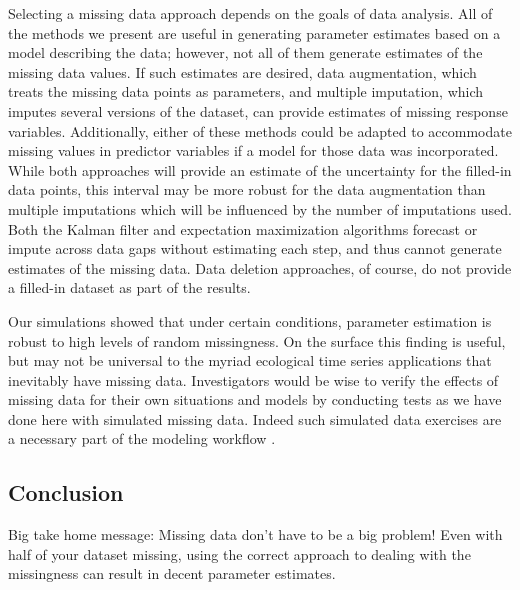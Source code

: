 Selecting a missing data approach depends on the goals of data analysis. All of the methods we present are useful in generating parameter estimates based on a model describing the data; however, not all of them generate estimates of the missing data values. If such estimates are desired, data augmentation, which treats the missing data points as parameters, and multiple imputation, which imputes several versions of the dataset, can provide estimates of missing response variables. Additionally, either of these methods could be adapted to accommodate missing values in predictor variables if a model for those data was incorporated. While both approaches will provide an estimate of the uncertainty for the filled-in data points, this interval may be more robust for the data augmentation than multiple imputations which will be influenced by the number of imputations used. Both the Kalman filter and expectation maximization algorithms forecast or impute across data gaps without estimating each step, and thus cannot generate estimates of the missing data. Data deletion approaches, of course, do not provide a filled-in dataset as part of the results. 




Our simulations showed that under certain conditions, parameter estimation is robust to high levels of random missingness.  On the surface this finding is useful, but may not be universal to the myriad ecological time series applications that inevitably have missing data. Investigators would be wise to verify the effects of missing data for their own situations and models by conducting tests as we have done here with simulated missing data. Indeed such simulated data exercises are a necessary part of the modeling workflow \citep{gelman2020bayesian}.  

\subsection{Conclusion}
Big take home message: Missing data don't have to be a big problem! Even with half of your dataset missing, using the correct approach to dealing with the missingness can result in decent parameter estimates.

